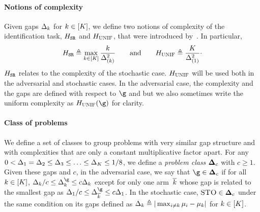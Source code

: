 \paragraph{Notions of complexity} Given 
gaps $\Delta_{k}$ for $k\in[K]$, we define two notions of 
complexity of the identification task, 
$H_{{\normalfont \texttt{SR}}}$ and $H_{{\normalfont \textsc{UNIF}}}$, that were introduced by~\cite{Audibert10BA}. 
In particular,
 \[
 H_{{\normalfont \texttt{SR}}}
 \triangleq
 \max_{k\in[K]}\frac{k}{\Delta^2_{(k)}}
 \qquad\text{and}\qquad
 H_{{\normalfont \textsc{UNIF}}} 
\triangleq
 \frac{K}{\Delta_{(1)}^2}\cdot
 \]
   $H_{{\normalfont \texttt{SR}}}$ relates to the complexity of the stochastic 
   case. $H_{{\normalfont \textsc{UNIF}}}$ will be used both in the 
   adversarial and stochastic cases. 
In the adversarial case, the complexity and the gaps 
are defined with respect to $\gainVector$ and 
but we also sometimes  write the uniform complexity as  $ \complexityUnif (\gainVector)$ for clarity.


\paragraph{Class of problems}  We define a set of classes to group problems with
very similar gap structure and with complexities that are only a 
constant multiplicative factor apart.
For any $0<\Delta_1=\Delta_2\leq\Delta_3\leq \ldots\leq 
\Delta_K\leq 1/8$, we define a \textit{problem class} 
$\boldsymbol{\Delta}_{c}$ with
$c\geq 1$. 
Given these gaps and $c$, in the adversarial case, we say that 
$\gainVector\in\Gaps_{c}$  if  for all $k\in[K]$, $\gap_k/c
 \leq\gap^{\gainVector}_k\leq c\gap_k$ except for only one 
 arm~$\overline k$  whose gap is related to the smallest gap as $\gap_{1}/c\leq\gap^{\gainVector}_{\refarm}\leq c\gap_{1}$.
In the stochastic case, $\textsc{STO}\in\boldsymbol{\Delta}_{c}$ under 
the same condition on its gaps defined as $\Delta_{k} \triangleq
 |\max_{i \neq k} \mu_{i} - \mu_{k}|$  for $k\in[K]$. 




